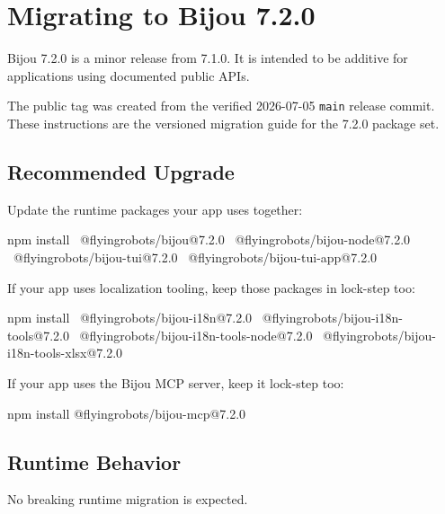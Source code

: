 \chapter{Migrating to Bijou 7.2.0}\label{record-272}

\smallskip

Bijou 7.2.0 is a minor release from 7.1.0. It is intended to be additive for applications using documented public APIs.

The public tag was created from the verified 2026-07-05 \texttt{m\allowbreak{}a\allowbreak{}i\allowbreak{}n} release commit. These instructions are the versioned migration guide for the 7.2.0 package set.

\section{Recommended Upgrade}\label{record-272-recommended-upgrade}

Update the runtime packages your app uses together:

\begin{CodeBlock}
npm install \
  @flyingrobots/bijou@7.2.0 \
  @flyingrobots/bijou-node@7.2.0 \
  @flyingrobots/bijou-tui@7.2.0 \
  @flyingrobots/bijou-tui-app@7.2.0
\end{CodeBlock}

If your app uses localization tooling, keep those packages in lock-step too:

\begin{CodeBlock}
npm install \
  @flyingrobots/bijou-i18n@7.2.0 \
  @flyingrobots/bijou-i18n-tools@7.2.0 \
  @flyingrobots/bijou-i18n-tools-node@7.2.0 \
  @flyingrobots/bijou-i18n-tools-xlsx@7.2.0
\end{CodeBlock}

If your app uses the Bijou MCP server, keep it lock-step too:

\begin{CodeBlock}
npm install @flyingrobots/bijou-mcp@7.2.0
\end{CodeBlock}

\section{Runtime Behavior}\label{record-272-runtime-behavior}

No breaking runtime migration is expected.

